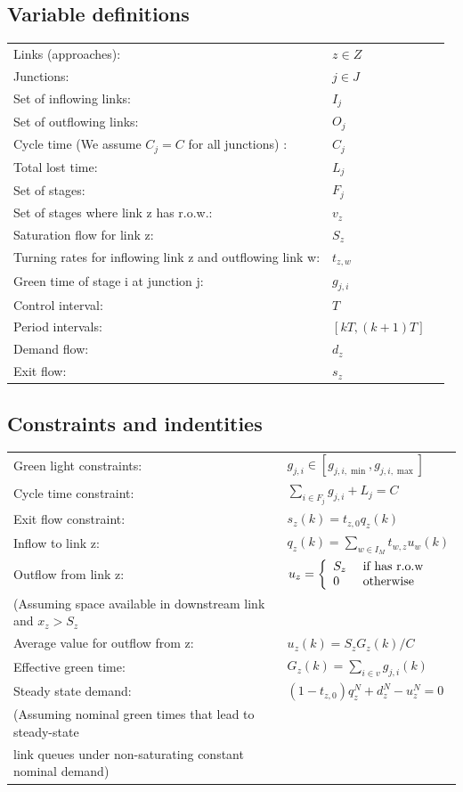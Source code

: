 \documentclass[11pt]{article}
\begin{document}
\subsection{Variable definitions}
\begin{tabular}{ l l c }
Links (approaches): & $z \in Z$  &\\
Junctions: & $j \in J$ &\\
Set of inflowing links: & $I_j$ &\\
Set of outflowing links: & $O_j$ &\\
Cycle time (We assume $C_j = C$ for all junctions) : & $C_j$ & \\
Total lost time: &$L_j$ &\\
Set of stages: & $F_j$ &\\
Set of stages where link z has r.o.w.: & $v_z$ &\\
Saturation flow for link z: & $S_z$ &\\
Turning rates for inflowing link z and outflowing link w: & $t_{z,w}$ &\\
Green time of stage i at junction j: & $g_{j,i}$ &\\
Control interval: & $T$ &\\
Period intervals: & $[k T,(k+1) T]$ &\\
Demand flow: & $d_z$ &\\
Exit flow: & $ s_z $ &\\
\end{tabular}

\subsection{Constraints and indentities}
\begin{tabular}{ l l }
Green light constraints: & $g_{j,i} \in \left[g_{j, i, \min }, g_{j, i, \max }\right]$ \\
Cycle time constraint: & $\sum_{i \in F_{j}} g_{j, i}+L_{j}=C$ \\
Exit flow constraint: & $s_{z}(k)=t_{z, 0} q_{z}(k)$ \\
Inflow to link z: & $q_{z}(k)= \sum_{w \in I_{M}} t_{w, z} u_{w}(k)$ \\
Outflow from link z: & $u_z = \left\{ \begin{array} { l l } { S_z } & { \text { if  has r.o.w}  } \\ { 0 } & { \text { otherwise} } \end{array} \right.$ \\
(Assuming space available in downstream link and $x_z>S_z$\\
Average value for outflow from z: & $u_{z}(k)=S_{z} G_{z}(k) / C$\\
Effective green time: & $G_{z}(k)=\sum_{i \in v} g_{j, i}(k)$ \\
Steady state demand: & $\left(1-t_{z, 0}\right) q_{z}^{N}+d_{z}^{N}-u_{z}^{N}=0$ \\
(Assuming nominal green times that lead to steady-state \\
link queues under non-saturating constant nominal demand) \\
\end{tabular}
\end{document}
